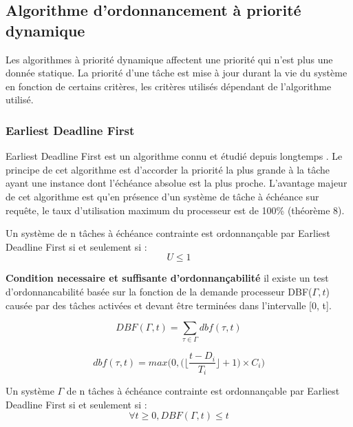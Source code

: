 \subsection{Algorithme d’ordonnancement à priorité dynamique}
\vspace{-1cm}
Les algorithmes à priorité dynamique affectent une priorité qui n'est plus une donnée statique.
La priorité d'une tâche est mise à jour durant la vie du système en fonction de certains critères, les critères utilisés dépendant de l'algorithme utilisé.

\subsubsection{Earliest Deadline First\cite{LL73}}
\vspace{-1cm}
Earliest Deadline First est un algorithme connu et étudié depuis longtemps \cite{LL73, Der74, Hor74}. Le principe de cet algorithme est d'accorder la priorité la plus grande à la tâche ayant une instance dont l'échéance absolue est la plus proche.
L'avantage majeur de cet algorithme est qu'en présence d'un système de tâche à échéance sur requête, le taux d'utilisation maximum du processeur est de 100\% (théorème 8).

\begin{theoreme}[\cite{LL73}]
 Un système de n tâches à échéance contrainte est ordonnançable par Earliest Deadline First si et seulement si :
 \begin{equation}
 U \leq 1
 \end{equation}
\end{theoreme}


\textbf{Condition necessaire et suffisante d'ordonnançabilité}\cite{BHR93} il existe un test d’ordonnancabilité basée sur la fonction
de la demande processeur DBF($\Gamma,t$) causée par des tâches activées et devant être terminées dans l’intervalle [0, t].

\begin{equation}
DBF(\Gamma,t) = \sum_{\tau \in \Gamma}dbf(\tau,t)
\end{equation}

\begin{equation}
dbf(\tau,t) = max \bigg( 0,\bigg( \bigg\lfloor \frac{t - D_i}{T_i} \bigg\rfloor + 1 \bigg) \times C_i \bigg)
\end{equation}

\begin{theoreme}
Un système $\Gamma$ de n tâches à échéance contrainte est ordonnançable par Earliest Deadline First si et seulement si :
\begin{equation}
\forall t \geq 0 , DBF(\Gamma,t) \leq t 
\end{equation}
\end{theoreme}

